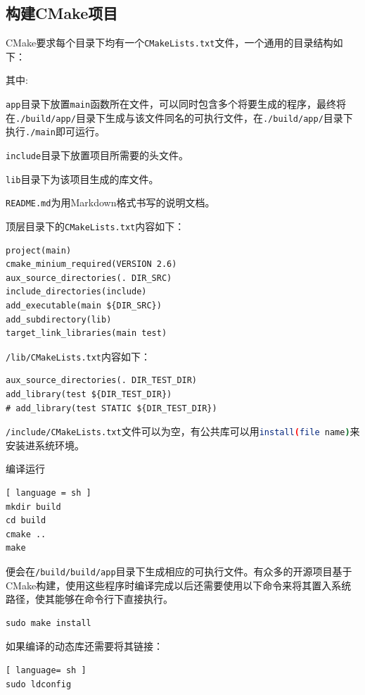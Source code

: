 		\subsection{构建CMake项目}
			\par CMake要求每个目录下均有一个\lstinline{CMakeLists.txt}文件，一个通用的目录结构如下：
			\par 其中:
			\par \lstinline{app}目录下放置\lstinline{main}函数所在文件，可以同时包含多个将要生成的程序，最终将在\lstinline{./build/app/}目录下生成与该文件同名的可执行文件，在\lstinline{./build/app/}目录下执行\lstinline{./main}即可运行。
			\par \lstinline{include}目录下放置项目所需要的头文件。
			\par \lstinline{lib}目录下为该项目生成的库文件。
			\par \lstinline{README.md}为用Markdown格式书写的说明文档。
			\par 顶层目录下的\lstinline{CMakeLists.txt}内容如下：
			\begin{lstlisting}
project(main)
cmake_minium_required(VERSION 2.6)
aux_source_directories(. DIR_SRC)
include_directories(include)
add_executable(main ${DIR_SRC})
add_subdirectory(lib)
target_link_libraries(main test)
			\end{lstlisting}
			\par \lstinline{/lib/CMakeLists.txt}内容如下：
			\begin{lstlisting}
aux_source_directories(. DIR_TEST_DIR)
add_library(test ${DIR_TEST_DIR})
# add_library(test STATIC ${DIR_TEST_DIR})
			\end{lstlisting}
			\par \lstinline{/include/CMakeLists.txt}文件可以为空，有公共库可以用\lstinline[language=sh]{install(file name)}来安装进系统环境。
			\par 编译运行
			\begin{lstlisting}[ language = sh ]
mkdir build
cd build
cmake ..
make
			\end{lstlisting}
			\par 便会在\lstinline{/build/build/app}目录下生成相应的可执行文件。有众多的开源项目基于CMake构建，使用这些程序时编译完成以后还需要使用以下命令来将其置入系统路径，使其能够在命令行下直接执行。
			\begin{lstlisting}
sudo make install
			\end{lstlisting}
			\par 如果编译的动态库还需要将其链接：
			\begin{lstlisting}[ language= sh ]
sudo ldconfig
			\end{lstlisting}
